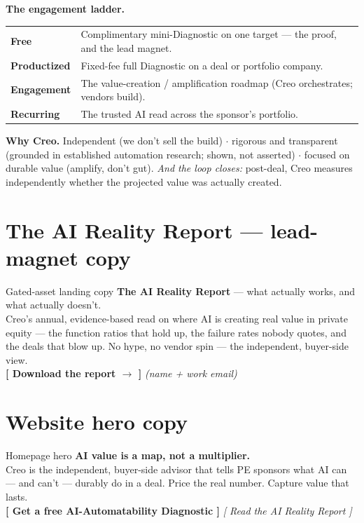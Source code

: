 \documentclass[11pt]{article}
\begin{document}
\textbf{The engagement ladder.}
\begin{center}
\renewcommand{\arraystretch}{1.2}\small
\begin{tabular}{p{2.6cm} p{9.6cm}}
\toprule
\textbf{Free} & Complimentary mini-Diagnostic on one target --- the proof, and the lead magnet. \\
\textbf{Productized} & Fixed-fee full Diagnostic on a deal or portfolio company. \\
\textbf{Engagement} & The value-creation / amplification roadmap (Creo orchestrates; vendors build). \\
\textbf{Recurring} & The trusted AI read across the sponsor's portfolio. \\
\bottomrule
\end{tabular}
\end{center}

\textbf{Why Creo.} Independent (we don't sell the build) $\cdot$ rigorous and transparent
(grounded in established automation research; shown, not asserted) $\cdot$ focused on durable
value (amplify, don't gut). \emph{And the loop closes:} post-deal, Creo measures independently
whether the projected value was actually created.

\section{The AI Reality Report --- lead-magnet copy}
\begin{copybox}{Gated-asset landing copy}
\textbf{The AI Reality Report} --- what actually works, and what actually doesn't.\\[3pt]
Creo's annual, evidence-based read on where AI is creating real value in private equity --- the
function ratios that hold up, the failure rates nobody quotes, and the deals that blow up. No
hype, no vendor spin --- the independent, buyer-side view.\\[3pt]
\textbf{[ Download the report $\rightarrow$ ]} \quad\emph{(name + work email)}
\end{copybox}

\section{Website hero copy}
\begin{copybox}{Homepage hero}
\textbf{\large AI value is a map, not a multiplier.}\\[4pt]
Creo is the independent, buyer-side advisor that tells PE sponsors what AI can --- and can't ---
durably do in a deal. Price the real number. Capture value that lasts.\\[4pt]
\textbf{[ Get a free AI-Automatability Diagnostic ]} \quad \emph{[ Read the AI Reality Report ]}
\end{copybox}
\end{document}
